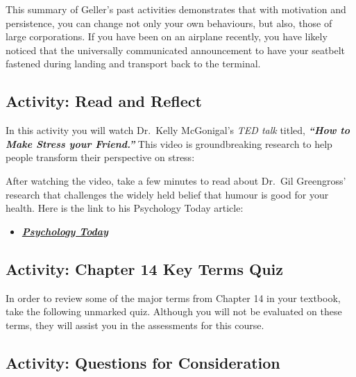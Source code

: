 \documentclass[
]{book}
\providecommand{\tightlist}{%
  \setlength{\itemsep}{0pt}\setlength{\parskip}{0pt}}
\begin{document}
This summary of Geller's past activities demonstrates that with motivation and persistence, you can change not only your own behaviours, but also, those of large corporations. If you have been on an airplane recently, you have likely noticed that the universally communicated announcement to have your seatbelt fastened during landing and transport back to the terminal.

\hypertarget{activity-read-and-reflect-15}{%
\subsection*{Activity: Read and Reflect}\label{activity-read-and-reflect-15}}

\begin{reflect}
In this activity you will watch Dr.~Kelly McGonigal's \emph{TED talk} titled, \textbf{\emph{``How to Make Stress your Friend.''}} This video is groundbreaking research to help people transform their perspective on stress:

After watching the video, take a few minutes to read about Dr.~Gil Greengross' research that challenges the widely held belief that humour is good for your health. Here is the link to his Psychology Today article:

\begin{itemize}
\tightlist
\item
  \href{https://www.psychologytoday.com/intl/blog/humor-sapiens/201805/humor-may-not-be-so-good-your-health}{\textbf{\emph{Psychology Today}}}
\end{itemize}
\end{reflect}

\hypertarget{activity-chapter-14-key-terms-quiz}{%
\subsection*{Activity: Chapter 14 Key Terms Quiz}\label{activity-chapter-14-key-terms-quiz}}

\begin{reflect}
In order to review some of the major terms from Chapter 14 in your textbook, take the following unmarked quiz. Although you will not be evaluated on these terms, they will assist you in the assessments for this course.
\end{reflect}

\hypertarget{activity-questions-for-consideration-16}{%
\subsection*{Activity: Questions for Consideration}\label{activity-questions-for-consideration-16}}
\end{document}
